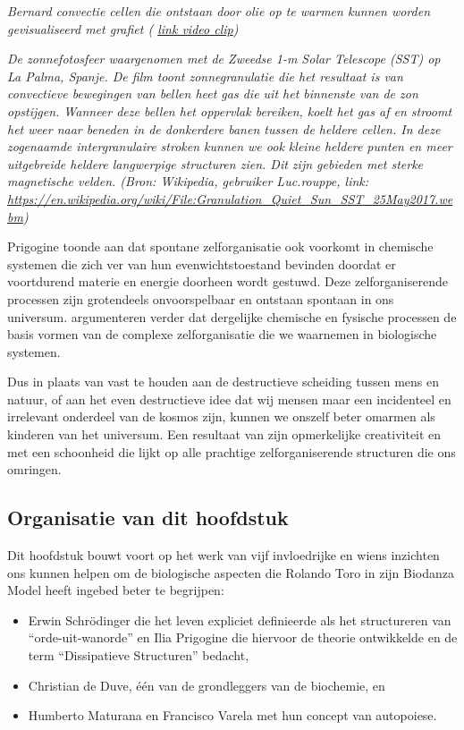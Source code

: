 \documentclass[
  11pt,
]{book}
\begin{document}
\emph{Bernard convectie cellen die ontstaan door olie op te warmen kunnen worden gevisualiseerd met grafiet (
\href{https://biodanzabrugge.be/biologischeAspectenBiodanza/figs/BernardCellenIk.mp4}{link video clip})}

\emph{De zonnefotosfeer waargenomen met de Zweedse 1-m Solar Telescope (SST) op La Palma, Spanje. De film toont zonnegranulatie die het resultaat is van convectieve bewegingen van bellen heet gas die uit het binnenste van de zon opstijgen. Wanneer deze bellen het oppervlak bereiken, koelt het gas af en stroomt het weer naar beneden in de donkerdere banen tussen de heldere cellen. In deze zogenaamde intergranulaire stroken kunnen we ook kleine heldere punten en meer uitgebreide heldere langwerpige structuren zien. Dit zijn gebieden met sterke magnetische velden. (Bron: Wikipedia, gebruiker Luc.rouppe, link: \url{https://en.wikipedia.org/wiki/File:Granulation_Quiet_Sun_SST_25May2017.webm})}

Prigogine toonde aan dat spontane zelforganisatie ook voorkomt in chemische systemen die zich ver van hun evenwichtstoestand bevinden doordat er voortdurend materie en energie doorheen wordt gestuwd. Deze zelforganiserende processen zijn grotendeels onvoorspelbaar en ontstaan spontaan in ons universum. \citet{prigogineStengers1984} argumenteren verder dat dergelijke chemische en fysische processen de basis vormen van de complexe zelforganisatie die we waarnemen in biologische systemen.

Dus in plaats van vast te houden aan de destructieve scheiding tussen mens en natuur, of aan het even destructieve idee dat wij mensen maar een incidenteel en irrelevant onderdeel van de kosmos zijn, kunnen we onszelf beter omarmen als kinderen van het universum. Een resultaat van zijn opmerkelijke creativiteit en met een schoonheid die lijkt op alle prachtige zelforganiserende structuren die ons omringen.

\hypertarget{organisatie-van-dit-hoofdstuk}{%
\subsection{Organisatie van dit hoofdstuk}\label{organisatie-van-dit-hoofdstuk}}

Dit hoofdstuk bouwt voort op het werk van vijf invloedrijke en wiens inzichten ons kunnen helpen om de biologische aspecten die Rolando Toro in zijn Biodanza Model heeft ingebed beter te begrijpen:

\begin{itemize}
\item
  Erwin Schrödinger die het leven expliciet definieerde als het structureren van ``orde-uit-wanorde'' en Ilia Prigogine die hiervoor de theorie ontwikkelde en de term ``Dissipatieve Structuren'' bedacht,
\item
  Christian de Duve, één van de grondleggers van de biochemie, en
\item
  Humberto Maturana en Francisco Varela met hun concept van autopoiese.
\end{itemize}
\end{document}
